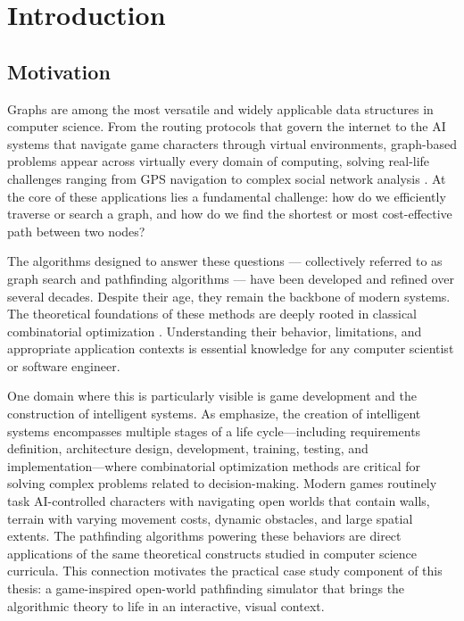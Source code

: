 \documentclass[12pt, a4paper, oneside]{report}
\theoremstyle{definition}
\begin{document}
\chapter{Introduction}

\section{Motivation}

Graphs are among the most versatile and widely applicable data structures in computer science. From the routing protocols that govern the internet to the AI systems that navigate game characters through virtual environments, graph-based problems appear across virtually every domain of computing, solving real-life challenges ranging from GPS navigation to complex social network analysis \citep{xomnia, numberdyslexia, builtin}. At the core of these applications lies a fundamental challenge: how do we efficiently traverse or search a graph, and how do we find the shortest or most cost-effective path between two nodes?

The algorithms designed to answer these questions — collectively referred to as graph search and pathfinding algorithms — have been developed and refined over several decades. Despite their age, they remain the backbone of modern systems. The theoretical foundations of these methods are deeply rooted in classical combinatorial optimization \citep{korte2018}. Understanding their behavior, limitations, and appropriate application contexts is essential knowledge for any computer scientist or software engineer.

One domain where this is particularly visible is game development and the construction of intelligent systems. As \citet{koliechkina2024} emphasize, the creation of intelligent systems encompasses multiple stages of a life cycle—including requirements definition, architecture design, development, training, testing, and implementation—where combinatorial optimization methods are critical for solving complex problems related to decision-making. Modern games routinely task AI-controlled characters with navigating open worlds that contain walls, terrain with varying movement costs, dynamic obstacles, and large spatial extents. The pathfinding algorithms powering these behaviors are direct applications of the same theoretical constructs studied in computer science curricula. This connection motivates the practical case study component of this thesis: a game-inspired open-world pathfinding simulator that brings the algorithmic theory to life in an interactive, visual context.
\end{document}
